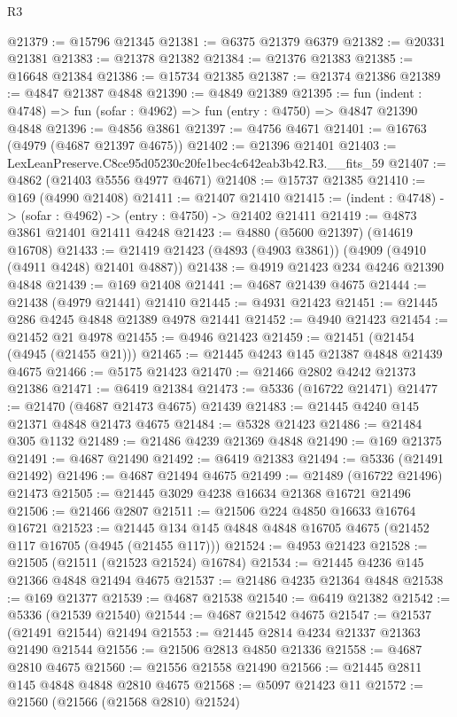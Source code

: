 \begin{lexlean}{R3}
\begin{coremodule}
@21379 := @15796 @21345
@21381 := @6375 @21379 @6379
@21382 := @20331 @21381
@21383 := @21378 @21382
@21384 := @21376 @21383
@21385 := @16648 @21384
@21386 := @15734 @21385
@21387 := @21374 @21386
@21389 := @4847 @21387 @4848
@21390 := @4849 @21389
@21395 := fun (indent : @4748) => fun (sofar : @4962) => fun (entry : @4750) => @4847 @21390 @4848
@21396 := @4856 @3861
@21397 := @4756 @4671
@21401 := @16763 (@4979 (@4687 @21397 @4675))
@21402 := @21396 @21401
@21403 := LexLeanPreserve.C8ce95d05230c20fe1bec4c642eab3b42.R3.__fits_59
@21407 := @4862 (@21403 @5556 @4977 @4671)
@21408 := @15737 @21385
@21410 := @169 (@4990 @21408)
@21411 := @21407 @21410
@21415 := (indent : @4748) -> (sofar : @4962) -> (entry : @4750) -> @21402 @21411
@21419 := @4873 @3861 @21401 @21411 @4248
@21423 := @4880 (@5600 @21397) (@14619 @16708)
@21433 := @21419 @21423 (@4893 (@4903 @3861)) (@4909 (@4910 (@4911 @4248) @21401 @4887))
@21438 := @4919 @21423 @234 @4246 @21390 @4848
@21439 := @169 @21408
@21441 := @4687 @21439 @4675
@21444 := @21438 (@4979 @21441) @21410
@21445 := @4931 @21423
@21451 := @21445 @286 @4245 @4848 @21389 @4978 @21441
@21452 := @4940 @21423
@21454 := @21452 @21 @4978
@21455 := @4946 @21423
@21459 := @21451 (@21454 (@4945 (@21455 @21)))
@21465 := @21445 @4243 @145 @21387 @4848 @21439 @4675
@21466 := @5175 @21423
@21470 := @21466 @2802 @4242 @21373 @21386
@21471 := @6419 @21384
@21473 := @5336 (@16722 @21471)
@21477 := @21470 (@4687 @21473 @4675) @21439
@21483 := @21445 @4240 @145 @21371 @4848 @21473 @4675
@21484 := @5328 @21423
@21486 := @21484 @305 @1132
@21489 := @21486 @4239 @21369 @4848
@21490 := @169 @21375
@21491 := @4687 @21490
@21492 := @6419 @21383
@21494 := @5336 (@21491 @21492)
@21496 := @4687 @21494 @4675
@21499 := @21489 (@16722 @21496) @21473
@21505 := @21445 @3029 @4238 @16634 @21368 @16721 @21496
@21506 := @21466 @2807
@21511 := @21506 @224 @4850 @16633 @16764 @16721
@21523 := @21445 @134 @145 @4848 @4848 @16705 @4675 (@21452 @117 @16705 (@4945 (@21455 @117)))
@21524 := @4953 @21423
@21528 := @21505 (@21511 (@21523 @21524) @16784)
@21534 := @21445 @4236 @145 @21366 @4848 @21494 @4675
@21537 := @21486 @4235 @21364 @4848
@21538 := @169 @21377
@21539 := @4687 @21538
@21540 := @6419 @21382
@21542 := @5336 (@21539 @21540)
@21544 := @4687 @21542 @4675
@21547 := @21537 (@21491 @21544) @21494
@21553 := @21445 @2814 @4234 @21337 @21363 @21490 @21544
@21556 := @21506 @2813 @4850 @21336
@21558 := @4687 @2810 @4675
@21560 := @21556 @21558 @21490
@21566 := @21445 @2811 @145 @4848 @4848 @2810 @4675
@21568 := @5097 @21423 @11
@21572 := @21560 (@21566 (@21568 @2810) @21524)

\end{coremodule}
\end{lexlean}
